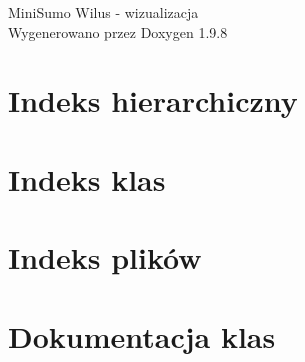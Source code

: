 \documentclass[twoside]{book}
\newcommand{\+}{\discretionary{\mbox{\scriptsize$\hookleftarrow$}}{}{}}
\newcommand{\clearemptydoublepage}{%
    \newpage{\pagestyle{empty}\cleardoublepage}%
  }
\begin{document}
  \raggedbottom
    \hypersetup{pageanchor=false,
                bookmarksnumbered=true,
                pdfencoding=unicode
               }
  \begin{titlepage}
  \vspace*{7cm}
  \begin{center}%
  {\Large Mini\+Sumo \textquotesingle{}\+Wilus\textquotesingle{} -\/ wizualizacja}\\
  \vspace*{1cm}
  {\large Wygenerowano przez Doxygen 1.9.8}\\
  \end{center}
  \end{titlepage}
  \clearemptydoublepage
  \tableofcontents
  \clearemptydoublepage
  \hypersetup{pageanchor=true}
\chapter{Indeks hierarchiczny}

\chapter{Indeks klas}

\chapter{Indeks plików}

\chapter{Dokumentacja klas}






















\end{document}
